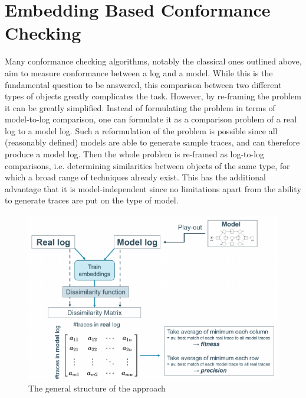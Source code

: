 \documentclass[runningheads]{template/llncs}
\begin{document}
\section{Embedding Based Conformance Checking}
\label{sec:method}
Many conformance checking algorithms, notably the classical ones outlined above, aim to measure conformance between a log and a model.
While this is the fundamental question to be answered, this comparison between two different types of objects greatly complicates the task.
However, by re-framing the problem it  can be greatly simplified.
Instead of formulating the problem in terms of model-to-log comparison, one can formulate it as a comparison problem of a real log to a model log.
Such a reformulation of the problem is possible since all (reasonably defined) models are able to generate sample traces, and can therefore produce a model log.
Then the whole problem is re-framed as log-to-log comparisons, i.e. determining similarities between objects of the same type, for which a broad range of techniques already exist.
This has the additional advantage that it is model-independent since no limitations apart from the ability to generate traces are put on the type of model.
\begin{figure}
	\centering
	\includegraphics[width=.8\textwidth]{figures/structure}
	\caption{The general structure of the approach}
	\label{fig:structure}
\end{figure}
\end{document}
